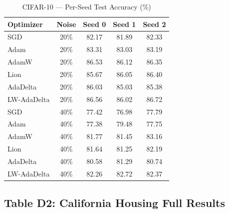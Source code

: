 \documentclass[11pt,a4paper]{article}
\begin{document}
\begin{table}[H]
\centering
\caption{CIFAR-10 --- Per-Seed Test Accuracy (\%)}
\label{tab:perseed-cifar}
\begin{tabular}{lcccc}
\toprule
\textbf{Optimizer} & \textbf{Noise} & \textbf{Seed 0} & \textbf{Seed 1} & \textbf{Seed 2} \\
\midrule
SGD & 20\% & 82.17 & 81.89 & 82.33 \\
Adam & 20\% & 83.31 & 83.03 & 83.19 \\
AdamW & 20\% & 86.53 & 86.12 & 86.35 \\
Lion & 20\% & 85.67 & 86.05 & 86.40 \\
AdaDelta & 20\% & 86.03 & 85.03 & 85.38 \\
LW-AdaDelta & 20\% & 86.56 & 86.02 & 86.72 \\
\midrule
SGD & 40\% & 77.42 & 76.98 & 77.79 \\
Adam & 40\% & 77.38 & 79.48 & 77.75 \\
AdamW & 40\% & 81.77 & 81.45 & 83.16 \\
Lion & 40\% & 81.64 & 81.25 & 82.19 \\
AdaDelta & 40\% & 80.58 & 81.29 & 80.74 \\
LW-AdaDelta & 40\% & 82.26 & 82.72 & 82.37 \\
\bottomrule
\end{tabular}
\end{table}

\subsection*{Table D2: California Housing Full Results}
\end{document}
